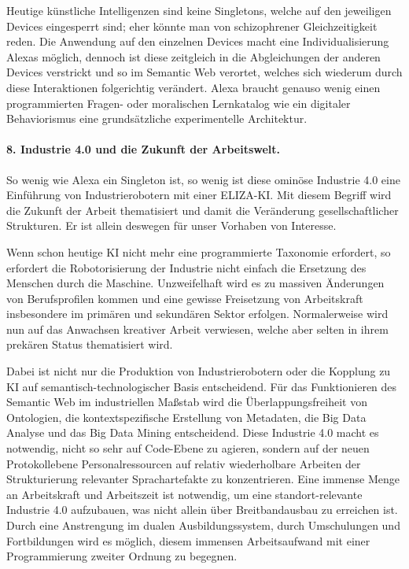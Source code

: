 \documentclass[12pt,a4paper]{article}
\begin{document}
Heutige künstliche Intelligenzen sind keine Singletons, welche auf den
jeweiligen Devices eingesperrt sind; eher könnte man von schizophrener
Gleichzeitigkeit reden. Die Anwendung auf den einzelnen Devices macht eine
Individualisierung Alexas möglich, dennoch ist diese zeitgleich in die
Abgleichungen der anderen Devices verstrickt und so im Semantic Web verortet,
welches sich wiederum durch diese Interaktionen folgerichtig verändert. Alexa
braucht genauso wenig einen programmierten Fragen- oder moralischen
Lernkatalog wie ein digitaler Behaviorismus eine grundsätzliche experimentelle
Architektur.

\paragraph{8. Industrie 4.0 und die Zukunft der Arbeitswelt.}

So wenig wie Alexa ein Singleton ist, so wenig ist diese ominöse Industrie 4.0
eine Einführung von Industrierobotern mit einer ELIZA-KI. Mit diesem Begriff
wird die Zukunft der Arbeit thematisiert und damit die Veränderung
gesellschaftlicher Strukturen. Er ist allein deswegen für unser Vorhaben von
Interesse.

Wenn schon heutige KI nicht mehr eine programmierte Taxonomie erfordert, so
erfordert die Robotorisierung der Industrie nicht einfach die Ersetzung des
Menschen durch die Maschine. Unzweifelhaft wird es zu massiven Änderungen von
Berufsprofilen kommen und eine gewisse Freisetzung von Arbeitskraft
insbesondere im primären und sekundären Sektor erfolgen.  Normalerweise wird
nun auf das Anwachsen kreativer Arbeit verwiesen, welche aber selten in ihrem
prekären Status thematisiert wird.

Dabei ist nicht nur die Produktion von Industrierobotern oder die Kopplung zu
KI auf semantisch-technologischer Basis entscheidend. Für das Funktionieren
des Semantic Web im industriellen Maßstab wird die Überlappungsfreiheit von
Ontologien, die kontextspezifische Erstellung von Metadaten, die Big Data
Analyse und das Big Data Mining entscheidend.  Diese Industrie 4.0 macht es
notwendig, nicht so sehr auf Code-Ebene zu agieren, sondern auf der neuen
Protokollebene Personalressourcen auf relativ wiederholbare Arbeiten der
Strukturierung relevanter Sprachartefakte zu konzentrieren. Eine immense Menge
an Arbeitskraft und Arbeitszeit ist notwendig, um eine standort-relevante
Industrie 4.0 aufzubauen, was nicht allein über Breitbandausbau zu erreichen
ist.  Durch eine Anstrengung im dualen Ausbildungssystem, durch Umschulungen
und Fortbildungen wird es möglich, diesem immensen Arbeitsaufwand mit einer
Programmierung zweiter Ordnung zu begegnen.
\end{document}
